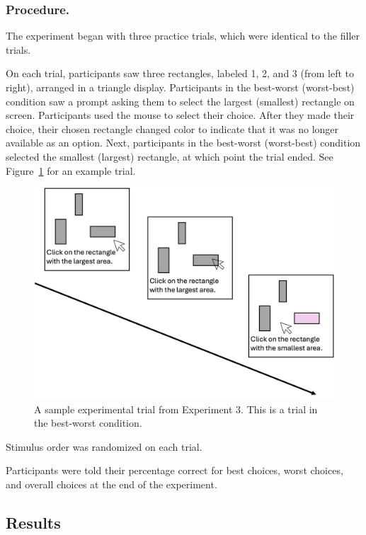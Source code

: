 \subsubsection{Procedure.}

The experiment began with three practice trials, which were identical to the filler trials. 

On each trial, participants saw three rectangles, labeled 1, 2, and 3 (from left to right), arranged in a triangle display. Participants in the best-worst (worst-best) condition saw a prompt asking them to select the largest (smallest) rectangle on screen. Participants used the mouse to select their choice. After they made their choice, their chosen rectangle changed color to indicate that it was no longer available as an option. Next, participants in the best-worst (worst-best) condition selected the smallest (largest) rectangle, at which point the trial ended. See Figure~\ref{fig:bw_example_trial} for an example trial.

\begin{figure}
   \centering
   \includegraphics[width=\linewidth]{figures/bw_design_fig.jpg}
   \caption{A sample experimental trial from Experiment 3. This is a trial in the best-worst condition.}
   \label{fig:bw_example_trial}
 \end{figure}
 
Stimulus order was randomized on each trial. 

Participants were told their percentage correct for best choices, worst choices, and overall choices at the end of the experiment.

\subsection{Results}

